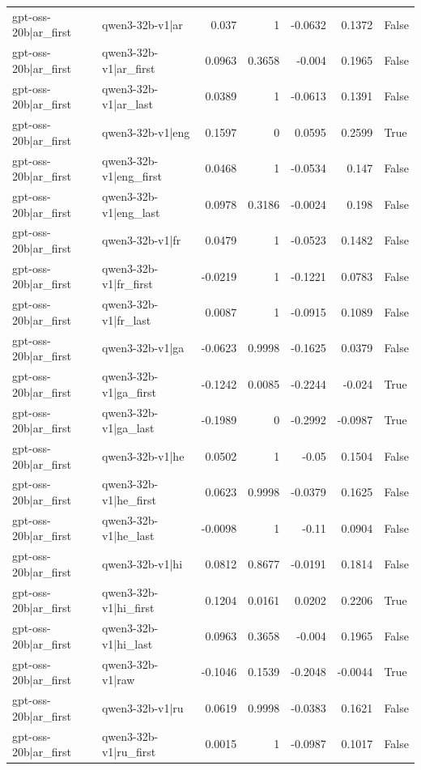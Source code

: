 \begin{table}
\begin{tabular}{l l r r r r l}
gpt-oss-20b|ar_first & qwen3-32b-v1|ar & 0.037 & 1 & -0.0632 & 0.1372 & False \\
gpt-oss-20b|ar_first & qwen3-32b-v1|ar_first & 0.0963 & 0.3658 & -0.004 & 0.1965 & False \\
gpt-oss-20b|ar_first & qwen3-32b-v1|ar_last & 0.0389 & 1 & -0.0613 & 0.1391 & False \\
gpt-oss-20b|ar_first & qwen3-32b-v1|eng & 0.1597 & 0 & 0.0595 & 0.2599 & True \\
gpt-oss-20b|ar_first & qwen3-32b-v1|eng_first & 0.0468 & 1 & -0.0534 & 0.147 & False \\
gpt-oss-20b|ar_first & qwen3-32b-v1|eng_last & 0.0978 & 0.3186 & -0.0024 & 0.198 & False \\
gpt-oss-20b|ar_first & qwen3-32b-v1|fr & 0.0479 & 1 & -0.0523 & 0.1482 & False \\
gpt-oss-20b|ar_first & qwen3-32b-v1|fr_first & -0.0219 & 1 & -0.1221 & 0.0783 & False \\
gpt-oss-20b|ar_first & qwen3-32b-v1|fr_last & 0.0087 & 1 & -0.0915 & 0.1089 & False \\
gpt-oss-20b|ar_first & qwen3-32b-v1|ga & -0.0623 & 0.9998 & -0.1625 & 0.0379 & False \\
gpt-oss-20b|ar_first & qwen3-32b-v1|ga_first & -0.1242 & 0.0085 & -0.2244 & -0.024 & True \\
gpt-oss-20b|ar_first & qwen3-32b-v1|ga_last & -0.1989 & 0 & -0.2992 & -0.0987 & True \\
gpt-oss-20b|ar_first & qwen3-32b-v1|he & 0.0502 & 1 & -0.05 & 0.1504 & False \\
gpt-oss-20b|ar_first & qwen3-32b-v1|he_first & 0.0623 & 0.9998 & -0.0379 & 0.1625 & False \\
gpt-oss-20b|ar_first & qwen3-32b-v1|he_last & -0.0098 & 1 & -0.11 & 0.0904 & False \\
gpt-oss-20b|ar_first & qwen3-32b-v1|hi & 0.0812 & 0.8677 & -0.0191 & 0.1814 & False \\
gpt-oss-20b|ar_first & qwen3-32b-v1|hi_first & 0.1204 & 0.0161 & 0.0202 & 0.2206 & True \\
gpt-oss-20b|ar_first & qwen3-32b-v1|hi_last & 0.0963 & 0.3658 & -0.004 & 0.1965 & False \\
gpt-oss-20b|ar_first & qwen3-32b-v1|raw & -0.1046 & 0.1539 & -0.2048 & -0.0044 & True \\
gpt-oss-20b|ar_first & qwen3-32b-v1|ru & 0.0619 & 0.9998 & -0.0383 & 0.1621 & False \\
gpt-oss-20b|ar_first & qwen3-32b-v1|ru_first & 0.0015 & 1 & -0.0987 & 0.1017 & False \\

\end{tabular}
\end{table}
